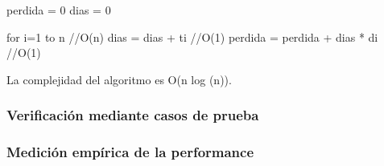 \documentclass[11pt, a4paper, twoside]{article}
\begin{document}
perdida = 0
dias = 0

for i=1 to n    //O(n)
    dias = dias + ti    //O(1)
    perdida = perdida + dias * di   //O(1)

La complejidad del algoritmo es O(n log (n)).


\subsubsection{Verificación mediante casos de prueba}

\subsubsection{Medición empírica de la performance}

\end{document}
